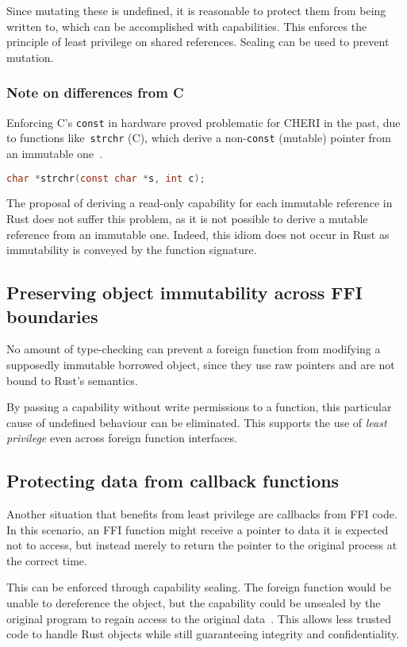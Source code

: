 \documentclass[dissertation.tex]{subfiles}
\begin{document}
Since mutating these is undefined, it is reasonable to protect them
from being written to, which can be accomplished with capabilities.
This enforces the principle of least privilege on shared references.
Sealing can be used to prevent mutation.

\subsubsection{Note on differences from C}
Enforcing C's \texttt{const} in hardware proved problematic for CHERI in
the past, due to functions like~\texttt{strchr} (C), which derive a
non-\texttt{const} (mutable) pointer from an immutable
one~\cite{cheri-prog-guide}.

\begin{lstlisting}[language=C]
char *strchr(const char *s, int c);
\end{lstlisting}

The proposal of deriving a read-only capability for each immutable
reference in Rust does not suffer this problem, as it is not possible to
derive a mutable reference from an immutable one.
Indeed, this idiom does not occur in Rust as immutability is conveyed by
the function signature.


\subsection{Preserving object immutability across FFI boundaries}
No amount of type-checking can prevent a foreign function from modifying
a supposedly immutable borrowed object, since they use raw pointers and
are not bound to Rust's semantics.

By passing a capability without write permissions to a function, this
particular cause of undefined behaviour can be eliminated.
This supports the use of \emph{least privilege} even across foreign
function interfaces.


\subsection{Protecting data from callback functions}
Another situation that benefits from least privilege are callbacks from
FFI code.
In this scenario, an FFI function might receive a pointer to data it is
expected not to access, but instead merely to return the pointer to the
original process at the correct time.

This can be enforced through capability sealing.
The foreign function would be unable to dereference the object, but the
capability could be unsealed by the original program to regain access to
the original data~\cite{cheri-v6}.
This allows less trusted code to handle Rust objects while still
guaranteeing integrity and confidentiality.
\end{document}
